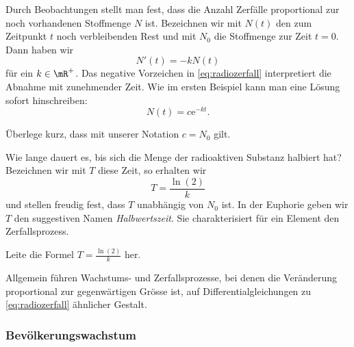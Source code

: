 \documentclass[%
11pt,%
twoside,%
titlepage,%
german,%
headsepline%
]{scrartcl}
\begin{document}
Durch
Beobachtungen stellt man fest, dass die Anzahl Zerf\"alle proportional zur noch vorhandenen Stoffmenge $N$ ist. Bezeichnen wir mit $N(t)$ den zum Zeitpunkt $t$ noch verbleibenden Rest und mit $N_0$ die Stoffmenge zur Zeit $t=0$. Dann haben wir
\begin{equation}\label{eq:radiozerfall}
N'(t)=-kN(t)
\end{equation}
f\"ur ein $k\in\mR^+$. Das negative Vorzeichen in \eqref{eq:radiozerfall} interpretiert die Abnahme mit zunehmender Zeit. Wie im ersten Beispiel kann man eine L\"osung sofort hinschreiben:
$$N(t)=c\mathrm{e}^{-kt}.$$

\begin{ueb}
\"Uberlege kurz, dass mit unserer Notation $c=N_0$ gilt.
\end{ueb}

Wie lange dauert es, bis sich die Menge der radioaktiven Substanz halbiert hat? Bezeichnen wir mit $T$ diese Zeit, so erhalten wir
$$T=\frac{\ln(2)}{k}$$
und stellen freudig fest, dass $T$ unabh\"angig von $N_0$ ist. In der Euphorie geben wir $T$ den suggestiven Namen \emph{Halbwertszeit}. Sie charakterisiert f\"ur ein Element den Zerfallsprozess.

\begin{ueb}
Leite die Formel $T=\frac{\ln(2)}{k}$ her.
\end{ueb}

\begin{bem}
Allgemein f\"uhren Wachstums- und Zerfallsprozesse, bei denen die Ver\"anderung proportional zur gegenw\"artigen Gr\"osse ist, auf Differentialgleichungen zu \eqref{eq:radiozerfall} \"ahnlicher Gestalt.
\end{bem}

\subsubsection{Bev\"olkerungswachstum}
\end{document}
